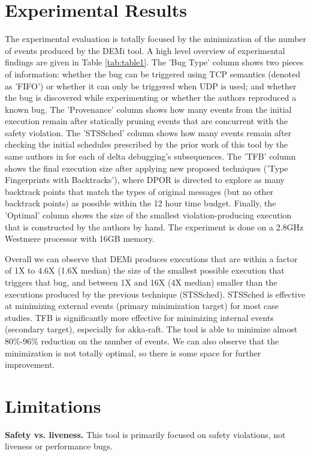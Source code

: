 \section{Experimental Results}
The experimental evaluation is totally focused by the minimization of the number of events produced by the DEMi tool. A high level overview of experimental findings are given in Table \ref{tab:table1}. The 'Bug Type' column shows two pieces of information: whether the bug can be triggered using TCP semantics (denoted as 'FIFO') or whether it can only be triggered when UDP is used; and whether the bug is  discovered while experimenting or whether the authors reproduced a known bug. The 'Provenance' column shows how many events from the initial execution remain after statically pruning events that are concurrent with the safety violation. The 'STSSched' column shows how many events remain after checking the initial schedules prescribed by the prior work of this tool by the same authors in \cite{3}  for each of delta debugging's subsequences. The 'TFB' column shows the final execution size after applying new proposed techniques ('Type Fingerprints with Backtracks'), where DPOR is directed to explore as many backtrack points that match the types of original messages (but no other backtrack points) as possible within the 12 hour time budget. Finally, the 'Optimal' column shows the size of the smallest violation-producing execution that is constructed by the authors by hand. The experiment is done on a 2.8GHz Westmere processor with 16GB memory.

Overall we can observe that DEMi produces executions that are within a factor of 1X to 4.6X (1.6X median) the size of the smallest possible execution that triggers that bug, and between 1X and 16X (4X median) smaller
than the executions produced by the previous technique (STSSched). STSSched is effective at minimizing external events (primary minimization target) for most case studies. TFB is significantly more effective for minimizing internal events (secondary target), especially for akka-raft. The tool is able to minimize almost 80\%-96\% reduction on the number of events. We can also observe that the minimization is not totally optimal, so there is some space for further improvement.

\section{Limitations}
\textbf{Safety vs. liveness.} This tool is primarily focused on safety violations, not liveness or performance bugs.

